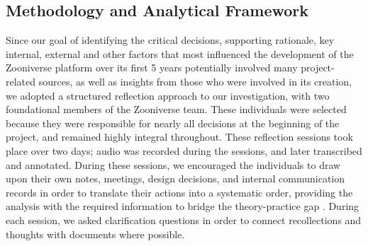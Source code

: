 \documentclass{sigchi}
\begin{document}
\begin{spacing}{0.97}

\section{Methodology and Analytical Framework}

Since our goal of identifying the critical decisions, supporting rationale, key internal, external and other factors that most influenced the development of the Zooniverse platform over its first 5 years potentially involved many project-related sources, as well as insights from those who were involved in its creation, we adopted a structured reflection \cite{Hilliard2006} approach to our investigation, with two foundational members of the Zooniverse team. These individuals were selected because they were responsible for nearly all decisions at the beginning of the project, and remained highly integral throughout. These reflection sessions took place over two days; audio was recorded during the sessions, and later transcribed and annotated. During these sessions, we encouraged the individuals to draw upon their own notes, meetings, design decisions, and internal communication records in order to translate their actions into a systematic order, providing the analysis with the required information to bridge the theory-practice gap \cite{Bulman2004}. During each session, we asked clarification questions in order to connect recollections and thoughts with documents where possible. 




\end{spacing}
\end{document}
